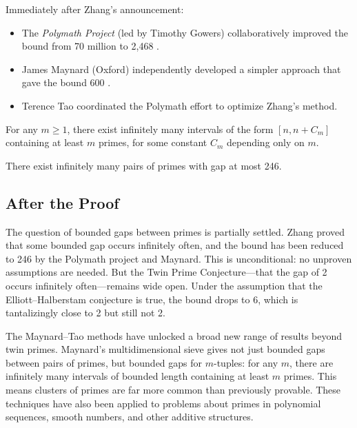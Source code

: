 Immediately after Zhang's announcement:

\begin{itemize}
\item The \emph{Polymath Project} (led by Timothy Gowers) collaboratively improved the bound from 70 million to 2,468 \cite{polymath2014}.
\item James Maynard (Oxford) independently developed a simpler approach that gave the bound 600 \cite{maynard2015}.
\item Terence Tao coordinated the Polymath effort to optimize Zhang's method.
\end{itemize}

\begin{theorem}
For any $m \geq 1$, there exist infinitely many intervals of the form $[n, n + C_m]$ containing at least $m$ primes, for some constant $C_m$ depending only on $m$.
\end{theorem}

\begin{theorem}
There exist infinitely many pairs of primes with gap at most 246.
\end{theorem}

\subsection{After the Proof}

The question of bounded gaps between primes is partially settled. Zhang proved that some bounded gap occurs infinitely often, and the bound has been reduced to 246 by the Polymath project and Maynard. This is unconditional: no unproven assumptions are needed. But the Twin Prime Conjecture---that the gap of 2 occurs infinitely often---remains wide open. Under the assumption that the Elliott--Halberstam conjecture is true, the bound drops to 6, which is tantalizingly close to 2 but still not 2.

The Maynard--Tao methods have unlocked a broad new range of results beyond twin primes. Maynard's multidimensional sieve gives not just bounded gaps between pairs of primes, but bounded gaps for $m$-tuples: for any $m$, there are infinitely many intervals of bounded length containing at least $m$ primes. This means clusters of primes are far more common than previously provable. These techniques have also been applied to problems about primes in polynomial sequences, smooth numbers, and other additive structures.

